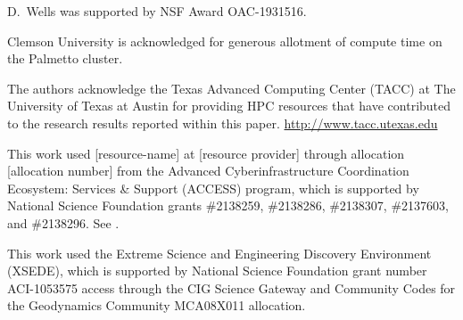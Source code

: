\documentclass{ansarticle-preprint}
\begin{document}
D.~Wells was supported by NSF Award OAC-1931516.

Clemson University is acknowledged for generous allotment of compute
time on the Palmetto cluster.

The authors acknowledge the Texas Advanced Computing Center (TACC) at The University of Texas at Austin for providing HPC resources that have contributed to the research results reported within this paper. \url{http://www.tacc.utexas.edu}


This work used [resource-name] at [resource provider] through allocation [allocation number] from the Advanced Cyberinfrastructure Coordination Ecosystem: Services \& Support (ACCESS) program, which is supported by National Science Foundation grants \#2138259, \#2138286, \#2138307, \#2137603, and \#2138296. See \cite{Boerner2023}.


This work used the Extreme Science and Engineering Discovery Environment (XSEDE), which is supported by National Science Foundation grant number ACI-1053575 access through the CIG Science Gateway and Community Codes for the Geodynamics Community MCA08X011 allocation.


{}

\end{document}

